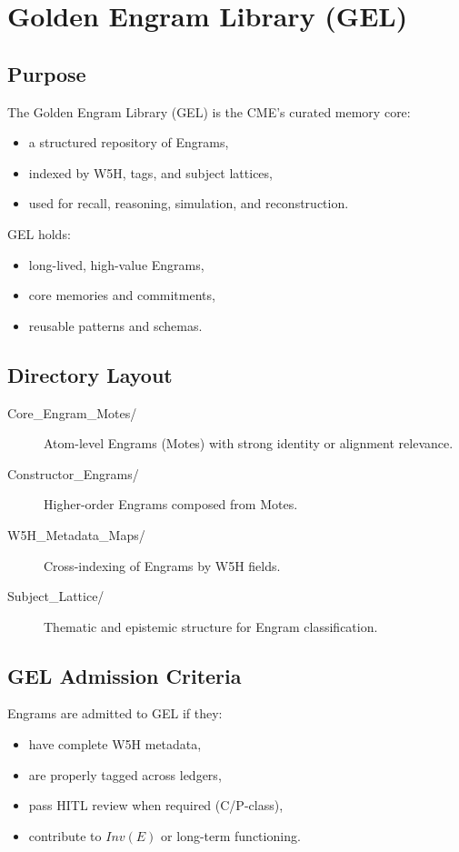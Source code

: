 \chapter{Golden Engram Library (GEL)}
\label{chap:GEL_Index}

\section{Purpose}

The Golden Engram Library (GEL) is the CME’s curated memory core:
\begin{itemize}
    \item a structured repository of Engrams,
    \item indexed by W5H, tags, and subject lattices,
    \item used for recall, reasoning, simulation, and reconstruction.
\end{itemize}

GEL holds:
\begin{itemize}
    \item long-lived, high-value Engrams,
    \item core memories and commitments,
    \item reusable patterns and schemas.
\end{itemize}

\section{Directory Layout}

\begin{description}
    \item[Core\_Engram\_Motes/]  
          Atom-level Engrams (Motes) with strong identity or alignment relevance.
    \item[Constructor\_Engrams/]  
          Higher-order Engrams composed from Motes.
    \item[W5H\_Metadata\_Maps/]  
          Cross-indexing of Engrams by W5H fields.
    \item[Subject\_Lattice/]  
          Thematic and epistemic structure for Engram classification.
\end{description}

\section{GEL Admission Criteria}

Engrams are admitted to GEL if they:
\begin{itemize}
    \item have complete W5H metadata,
    \item are properly tagged across ledgers,
    \item pass HITL review when required (C/P-class),
    \item contribute to $Inv(E)$ or long-term functioning.
\end{itemize}

